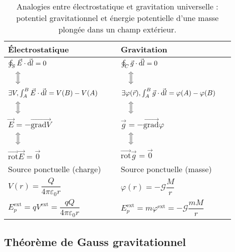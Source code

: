     \begin{table}
        \centering
        \begin{tabular}{p{0.45\linewidth}|p{0.45\linewidth}}
            \toprule
            Électrostatique & Gravitation \\ \midrule
            $\oint_{S}\vec{E}\cdot\vec{\mathrm{d} l}=0$ & $\oint_{C}\vec{g}\cdot\vec{\mathrm{d} l}=0$\\[0.25cm]
            $\quad\Big\Updownarrow$&$\quad\Big\Updownarrow$\\[0.25cm]
            $\exists V, \int_{A}^{B}\vec{E}\cdot\vec{\mathrm{d} l}=V(B)-V(A)$ & $\exists \varphi(\vec{r}),\int_{A}^{B}\vec{g}\cdot\vec{\mathrm{d} l}=\varphi(A)-\varphi(B)$\\[0.25cm]
            $\quad\Big\Updownarrow$&$\quad\Big\Updownarrow$\\[0.25cm]
            $\vec{E}=-\vec{\mathrm{grad}V}$ & $\vec{g}=-\vec{\mathrm{grad}}\varphi$\\[0.25cm]
            $\quad\Big\Updownarrow$&$\quad\Big\Updownarrow$\\[0.25cm]
            $\vec{\mathrm{rot}}\vec{E}=\vec{0}$ & $\vec{\mathrm{rot}}\vec{g}=\vec{0}$\\ \midrule
            Source ponctuelle (charge) & Source ponctuelle (masse)\\ \midrule
            $V(r)=\dfrac{Q}{4\pi\varepsilon_0 r}$ & $\varphi(r)=-\mathcal{G}\dfrac{M}{r}$\\ \midrule
            $E_{p}^{\text{ext}}=qV^{\text{ext}}=\dfrac{qQ}{4\pi\varepsilon_0 r}$ & $E_p^{\text{ext}}=m\varphi^{\text{ext}}=-\mathcal{G}\dfrac{mM}{r}$\\
            \bottomrule
        \end{tabular}    
        \caption{Analogies entre électrostatique et gravitation universelle : potentiel gravitationnel et énergie potentielle d'une masse plongée dans un champ extérieur.}
        \label{tab:analogie_gravitation_universelle_potentiel_gravitationnel}
    \end{table}

    \subsection{Théorème de Gauss gravitationnel}

